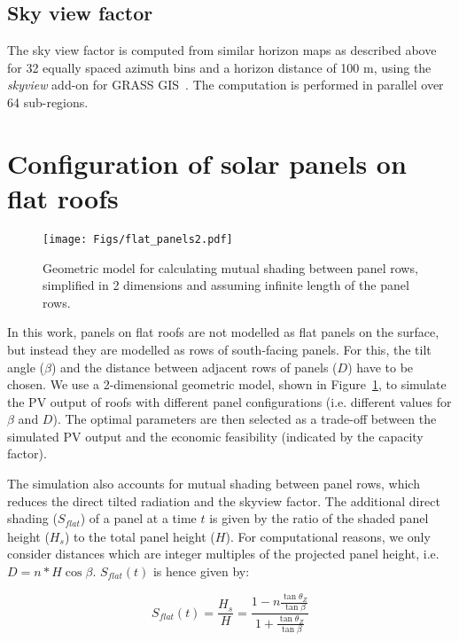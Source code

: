 \subsection*{Sky view factor}

The sky view factor is computed from similar horizon maps as described above for 32 equally spaced azimuth bins and a horizon distance of 100 m, using the \textit{skyview} add-on for GRASS GIS~\cite{zaksek_sky-view_2011}. The computation is performed in parallel over 64 sub-regions.



\section{Configuration of solar panels on flat roofs}
\label{app_flat}

\begin{figure}[tb]
	\centering
	\texttt{[image: Figs/flat\_panels2.pdf]}  
	\caption{Geometric model for calculating mutual shading between panel rows, simplified in 2 dimensions and assuming infinite length of the panel rows.}
	\label{fig:flat_concept}
\end{figure}

In this work, panels on flat roofs are not modelled as flat panels on the surface, but instead they are modelled as rows of south-facing panels. For this, the tilt angle ($\beta$) and the distance between adjacent rows of panels ($D$) have to be chosen. We use a 2-dimensional geometric model, shown in Figure~\ref{fig:flat_concept}, to simulate the PV output of roofs with different panel configurations (i.e. different values for $\beta$ and $D$). The optimal parameters are then selected as a trade-off between the simulated PV output and the economic feasibility (indicated by the capacity factor).

The simulation also accounts for mutual shading between panel rows, which reduces the direct tilted radiation and the skyview factor.
The additional direct shading ($S_{\mathit{flat}}$) of a panel at a time $t$ is given by the ratio of the shaded panel height ($H_s$) to the total panel height ($H$). For computational reasons, we only consider distances which are integer multiples of the projected panel height, i.e. $D=n*H \cos{\beta}$. $S_{\mathit{flat}}(t)$ is hence given by:

\begin{equation}
\label{eq:flat_Sh}
    S_{\mathit{flat}}(t) = \frac{H_s}{H} =  \frac{1 - n \frac{\tan{\theta_Z}}{\tan{\beta}}}
               {1 + \frac{\tan{\theta_Z}}{\tan{\beta}}}
\end{equation}

